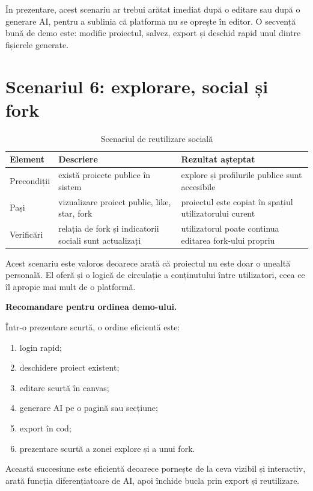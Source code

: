 În prezentare, acest scenariu ar trebui arătat imediat după o editare sau după o generare AI, pentru a sublinia că platforma nu se oprește în editor. O secvență bună de demo este: modific proiectul, salvez, export și deschid rapid unul dintre fișierele generate.

\section{Scenariul 6: explorare, social și fork}

\begin{table}[!htbp]
  \centering
  \caption{Scenariul de reutilizare socială}
  \renewcommand{\arraystretch}{1.15}
  \begin{tabularx}{\textwidth}{>{\RaggedRight\arraybackslash}p{3.2cm}YY}
    \toprule
    \textbf{Element} & \textbf{Descriere} & \textbf{Rezultat așteptat} \\
    \midrule
    Precondiții & există proiecte publice în sistem & explore și profilurile publice sunt accesibile \\
    Pași & vizualizare proiect public, like, star, fork & proiectul este copiat în spațiul utilizatorului curent \\
    Verificări & relația de fork și indicatorii sociali sunt actualizați & utilizatorul poate continua editarea fork-ului propriu \\
    \bottomrule
  \end{tabularx}
\end{table}

Acest scenariu este valoros deoarece arată că proiectul nu este doar o unealtă personală. El oferă și o logică de circulație a conținutului între utilizatori, ceea ce îl apropie mai mult de o platformă.

\noindent\textbf{Recomandare pentru ordinea demo-ului.}

Într-o prezentare scurtă, o ordine eficientă este:

\begin{enumerate}[leftmargin=1.5cm,topsep=2pt,itemsep=1pt]
  \item login rapid;
  \item deschidere proiect existent;
  \item editare scurtă în canvas;
  \item generare AI pe o pagină sau secțiune;
  \item export în cod;
  \item prezentare scurtă a zonei explore și a unui fork.
\end{enumerate}

Această succesiune este eficientă deoarece pornește de la ceva vizibil și interactiv, arată funcția diferențiatoare de AI, apoi închide bucla prin export și reutilizare.
